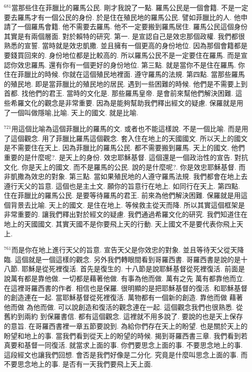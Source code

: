 \documentclass{book}
\begin{document}
$^{681}$當那些住在菲臘比的羅馬公民.
剛才我說了一點.
羅馬公民是一個會籍.
不是一定要去羅馬才有一個公民的身份.
於是住在殖民地的羅馬公民.
譬如菲臘比的人.
他申請了一個羅馬會籍.
他不需要去羅馬.
他不一定要搬到羅馬居住.
羅馬公民這個身份其實是有兩個層面.
對於賴特的研究.
第一.
是宣認自己是效忠那個政權.
我們都很熟悉的宣誓.
當時就是效忠凱撒.
並且擁有一個更高的身份地位.
因為那個會籍都是要錢買回來的.
身份地位都是比較高的.
所以羅馬公民不是一定要住在羅馬.
而是宣認你效忠羅馬.
還有你有一個更好的身份地位.
第三點.
就是當你不是住在羅馬.
你住在菲臘比的時候.
你就在這個殖民地裡面.
遵守羅馬的法規.
第四點.
當那些羅馬的殖民地.
即是當菲臘比的殖民地的居民.
遇到一些困難的時候.
他們是不需要上到首都.
找他們的君王.
當時的文化是.
那些羅馬皇帝.
是會前來幫他們解決困難.
這些希羅文化的觀念是非常重要.
因為是能夠幫助我們釋出經文的疑慮.
保羅就是用了一個叫做隱喻,比喻.
天上的國文.
就是比喻.

$^{721}$用這個比喻為這個菲臘比的羅馬的文.
或者也不能這樣說.
不是一個比喻.
而是用了這個觀念.
用了菲臘比羅馬這個觀念.
套入住在地上的天國國文.
所以天上的國文是不需要住在天上.
因為菲臘比的羅馬公民.
都不需要搬到羅馬.
天上的國文.
他們重要的是什麼呢?.
是天上的身份.
效忠耶穌基督.
這個還是一個政治性的宣告.
對抗文化.
你是天上的國文.
而不是羅馬的公民.
說的是什麼呢?.
你是效忠耶穌基督.
而非凱撒為效忠的對象.
第三點.
當如果殖民地的人遵守羅馬法規.
我們都會在地上去遵行天父的旨意.
這個也是主土文.
願你的旨意行在地上.
如同行在天上.
第四點.
住在菲臘比的羅馬公民.
是要等待羅馬的君王.
前來為他們解決困難.
保羅就是用這個背景去比喻.
天上的國文.
是住在地上.
等候救主從天而降.
所以其實這個框架是非常重要的.
讓我們釋出對於經文的疑慮.
我們通過希羅文化的研究.
我們知道住在地上的天國國文.
其實天國不是你要飛上天的行動.
天上國文不是要代表你飛上天上.

$^{761}$而是你在地上進行天父的旨意.
宣告天父是你效忠的對象.
並且等待天父從天降臨.
這個就是一個這樣的觀念.
另外我們轉眼間看到哥羅西書.
哥羅西書是說的是十八節.
耶穌是從死裡復活.
首先是復生的.
十八節是說耶穌基督從死裡復活.
前面是說萬有都是靠他做.
一切都是藉著他做.
有事為他而做.
萬有之先 萬有都靠他而立.
在這裡哥羅西書的作者.
相信也是保羅.
很明顯的是把耶穌基督的復活.
和耶穌基督的創造連在一起.
當耶穌基督從死裡復活.
萬物都有一個新的創造.
靠他而做 藉著他而做 為他而做.
可以說創造和復活的觀念連在一起.
這個觀念我們也很熟悉.
從舊約到兩約 到保羅書信.
都有這個觀念.
這裡就不用多說了.
要說的也是天上保存的意旨.
在哥羅西書裡一章五節要說到.
為給你們存在天上的盼望.
也是關於天上的盼望和地上的事.
當我們看到從天上的盼望的時候.
揭到哥羅西書三章.
我們看到若真要和基督一同復活.
就當求上面的事.
你們要思念上面的事.
不要思念地上的事.
這段經文也讓我們回想.
會否是我們好像是二分化.
究竟是什麼叫思念上面的事.
而不要思念地上的事.
是否有一天我們要飛上天上面.
\end{document}
